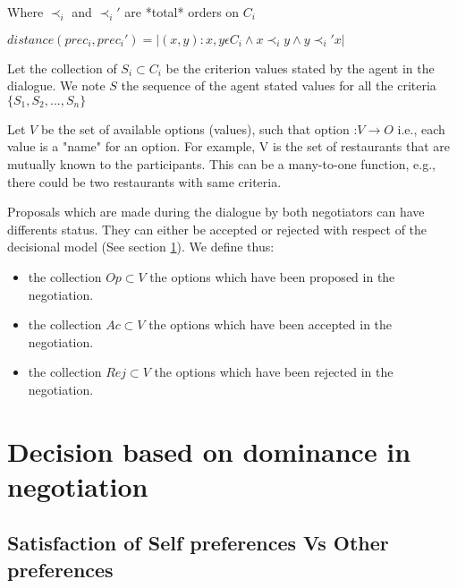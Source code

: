 \documentclass{article}
\begin{document}
		Where $\prec_i$ and $\prec_i'$ are *total* orders on $C_i$
		
		$distance(prec_i, prec_i') = | { (x, y) : x,y \epsilon C_i \wedge x \prec_i y \wedge y \prec_i' x} |$
		
		Let the collection of $S_i \subset C_i$ be the criterion values stated by the agent in the dialogue. We note $S$ the sequence of the agent stated values for all the criteria $\{S_1, S_2,..., S_n\}$
		
		Let $V$ be the set of available options (values), such that option :$ V\rightarrow O$	i.e., each value is a "name" for an option.  For example, V is the set of restaurants that are mutually known to the participants. This can be a many-to-one function, e.g., there could be two restaurants with same criteria.			
		
		Proposals which are made during the dialogue by both negotiators can have differents status. They can either be accepted or rejected with respect of the decisional model (See section \ref{decision}). We define thus:
		\begin{itemize}
			\item the collection $Op \subset V$ the options which have been proposed in the negotiation.
			\item the collection $Ac \subset V$  the options which have been accepted in the negotiation.
			\item the collection $Rej \subset V$  the options which have been rejected in the negotiation.
			
		\end{itemize} 

	\section{Decision based on dominance in negotiation}
	\label{decision}
	\subsection{Satisfaction of Self preferences Vs Other preferences}
	
\end{document}

